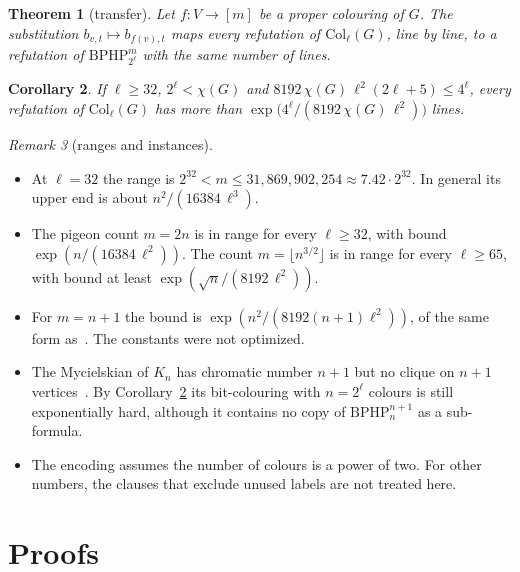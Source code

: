 \documentclass[11pt]{article}
\newtheorem{theorem}{Theorem}
\newtheorem{corollary}[theorem]{Corollary}
\theoremstyle{remark}
\newtheorem{remark}[theorem]{Remark}
\newcommand{\BPHP}{\mathrm{BPHP}}
\newcommand{\Col}{\mathrm{Col}}
\begin{document}
\begin{theorem}[transfer]\label{thm:transfer}
Let $f\colon V\to[m]$ be a proper colouring of $G$. The substitution
$b_{v,t}\mapsto b_{f(v),t}$ maps every refutation of $\Col_\ell(G)$, line by
line, to a refutation of $\BPHP^m_{2^\ell}$ with the same number of lines.
\end{theorem}

\begin{corollary}\label{cor:colouring}
If $\ell\ge32$, $2^\ell<\chi(G)$ and $8192\,\chi(G)\,\ell^2(2\ell+5)\le 4^\ell$,
every refutation of $\Col_\ell(G)$ has more than
$\exp\bigl(4^\ell/(8192\,\chi(G)\,\ell^2)\bigr)$ lines.
\end{corollary}

\begin{remark}[ranges and instances]\leavevmode
\begin{itemize}
\item At $\ell=32$ the range is $2^{32}<m\le 31{,}869{,}902{,}254\approx 7.42\cdot
2^{32}$. In general its upper end is about $n^2/(16384\,\ell^3)$.
\item The pigeon count $m=2n$ is in range for every $\ell\ge32$, with bound
$\exp(n/(16384\,\ell^2))$. The count $m=\lfloor n^{3/2}\rfloor$ is in range
for every $\ell\ge65$, with bound at least $\exp(\sqrt n/(8192\,\ell^2))$.
\item For $m=n+1$ the bound is $\exp(n^2/(8192(n+1)\ell^2))$, of the same form
as~\cite{Br26}. The constants were not optimized.
\item The Mycielskian of $K_n$ has chromatic number $n+1$ but no clique on
$n+1$ vertices~\cite{My55}. By Corollary~\ref{cor:colouring} its bit-colouring
with $n=2^\ell$ colours is still exponentially hard, although it contains no
copy of $\BPHP^{n+1}_n$ as a sub-formula.
\item The encoding assumes the number of colours is a power of two. For other
numbers, the clauses that exclude unused labels are not treated here.
\end{itemize}
\end{remark}

\section{Proofs}
\end{document}
